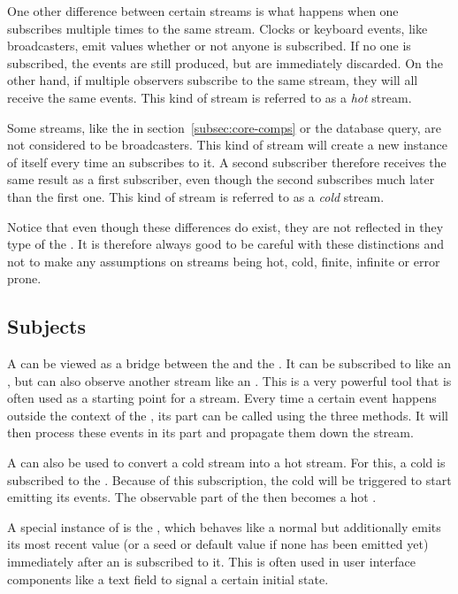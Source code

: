 One other difference between certain streams is what happens when one subscribes multiple times to the same stream. Clocks or keyboard events, like broadcasters, emit values whether or not anyone is subscribed. If no one is subscribed, the events are still produced, but are immediately discarded. On the other hand, if multiple observers subscribe to the same stream, they will all receive the same events. This kind of stream is referred to as a \textit{hot} stream.

Some streams, like the  in section~\ref{subsec:core-comps} or the database query, are not considered to be broadcasters. This kind of stream will create a new instance of itself every time an \obv subscribes to it. A second subscriber therefore receives the same result as a first subscriber, even though the second subscribes much later than the first one. This kind of stream is referred to as a \textit{cold} stream.


Notice that even though these differences do exist, they are not reflected in they type of the \obs. It is therefore always good to be careful with these distinctions and not to make any assumptions on streams being hot, cold, finite, infinite or error prone.

\subsection{Subjects}
A \subj can be viewed as a bridge between the \obv and the \obs. It can be subscribed to like an \obs, but can also observe another stream like an \obv. This is a very powerful tool that is often used as a starting point for a stream. Every time a certain event happens outside the context of the \subj, its \obv part can be called using the three methods. It will then process these events in its \obs part and propagate them down the stream.

A \subj can also be used to convert a cold stream into a hot stream. For this, a cold \obs is subscribed to the \subj. Because of this subscription, the cold \obs will be triggered to start emitting its events. The observable part of the \subj then becomes a hot \obs.

A special instance of \subj is the \bsubj, which behaves like a normal \subj but additionally emits its most recent value (or a seed or default value if none has been emitted yet) immediately after an \obv is subscribed to it. This is often used in user interface components like a text field to signal a certain initial state.
